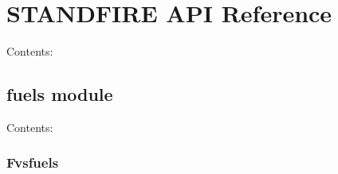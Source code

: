 \documentclass[letterpaper,10pt,english]{sphinxmanual}
\begin{document}
\chapter{STANDFIRE API Reference}
\label{api_ref:standfire-api-reference}\label{api_ref::doc}
Contents:


\section{fuels module}
\label{fuels:module-fuels}\label{fuels::doc}\label{fuels:fuels-module}
Contents:


\subsection{Fvsfuels}
\label{Fvsfuels::doc}\label{Fvsfuels:fvsfuels}
\end{document}
